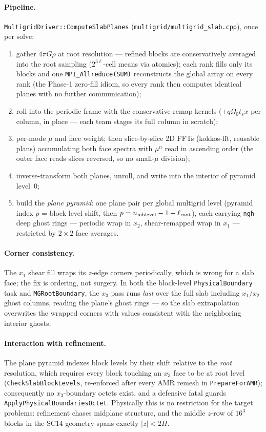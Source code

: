 \documentclass[11pt]{article}
\newcommand{\code}[1]{\texttt{#1}}
\newcommand{\file}[1]{\texttt{\small #1}}
\newcommand{\fn}[1]{\texttt{\small #1}}
\newcommand{\Om}{\Omega_0}
\begin{document}
\paragraph{Pipeline.} \fn{MultigridDriver::ComputeSlabPlanes}
(\file{multigrid/multigrid\_slab.cpp}), once per solve:
\begin{enumerate}\itemsep2pt
\item gather $4\pi G\rho$ at root resolution --- refined blocks are conservatively
      averaged into the root sampling ($2^{3\ell}$-cell means via atomics); each rank
      fills only its blocks and one \code{MPI\_Allreduce(SUM)} reconstructs the
      global array on every rank (the Phase-1 zero-fill idiom, so every rank then
      computes identical planes with no further communication);
\item roll into the periodic frame with the conservative remap kernels
      ($+q\Om t_s x$ per column, in place --- each team stages its full column in
      scratch);
\item per-mode $\mu$ and face weight; then slice-by-slice 2D FFTs (kokkos-fft,
      reusable plans) accumulating both face spectra with $\mu^{n}$ read in
      ascending order (the outer face reads slices reversed, so no small-$\mu$
      division);
\item inverse-transform both planes, unroll, and write into the interior of pyramid
      level~0;
\item build the \emph{plane pyramid}: one plane pair per global multigrid level
      (pyramid index $p$ = block level shift, then $p = n_{\rm mblevel} - 1 +
      \ell_{\rm root}$), each carrying \code{ngh}-deep ghost rings --- periodic wrap
      in $x_2$, shear-remapped wrap in $x_1$ --- restricted by $2\times2$ face
      averages.
\end{enumerate}

\paragraph{Corner consistency.} The $x_1$ shear fill wraps its $z$-edge corners
periodically, which is wrong for a slab face; the fix is ordering, not surgery. In
both the block-level \fn{PhysicalBoundary} task and \fn{MGRootBoundary}, the $x_3$
pass runs \emph{last} over the full slab including $x_1/x_2$ ghost columns, reading
the plane's ghost rings --- so the slab extrapolation overwrites the wrapped corners
with values consistent with the neighboring interior ghosts.

\paragraph{Interaction with refinement.} The plane pyramid indexes block levels by
their shift relative to the \emph{root} resolution, which requires every block
touching an $x_3$ face to be at root level (\fn{CheckSlabBlockLevels}, re-enforced
after every AMR remesh in \fn{PrepareForAMR}); consequently no $x_3$-boundary octets
exist, and a defensive fatal guards \fn{ApplyPhysicalBoundariesOctet}. Physically
this is no restriction for the target problems: refinement chases midplane structure,
and the middle $z$-row of $16^3$ blocks in the SC14 geometry spans exactly
$|z| < 2H$.
\end{document}
